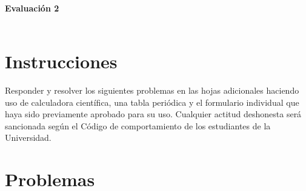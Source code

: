 \documentclass[a4paper,12pt]{article}
\begin{document}

\begin{center}
\HRule \\[0.4cm]
{ \bfseries Evaluaci\'on 2}\\ %
\HRule \\[0.4cm]
\end{center}


\section*{Instrucciones}

Responder y resolver los siguientes problemas en las hojas adicionales haciendo uso de calculadora cient\'ifica, una tabla peri\'odica y el formulario individual que haya sido previamente aprobado para su uso. Cualquier actitud deshonesta ser\'a sancionada seg\'un el C\'odigo de comportamiento de los estudiantes de la Universidad.

\section*{Problemas}
\end{document}
